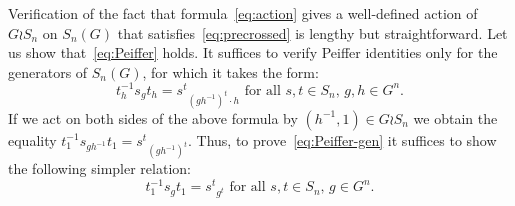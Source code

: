 \documentclass[oneside, 12pt]{amsart}
\theoremstyle{plain}
\numberwithin{equation}{section}
\numberwithin{lemma}{section}
\theoremstyle{remark}
\theoremstyle{definition}
\begin{document}

Verification of the fact that formula~\eqref{eq:action} gives a well-defined action of $G\wr S_n$ on $S_n(G)$ 
 that satisfies~\eqref{eq:precrossed} is lengthy but straightforward. Let us show that~\eqref{eq:Peiffer} holds. 
It suffices to verify Peiffer identities only for the generators of $S_n(G)$, for which it takes the form:
\begin{equation} \label{eq:Peiffer-gen} t^{-1}_h s_g t_h = {s^t}_{(gh^{-1})^t\cdot h} \text{ for all $s, t \in S_n$, $g, h\in G^n$.}\end{equation}
If we act on both sides of the above formula by $(h^{-1}, 1) \in G \wr S_n$ we obtain the equality
$t^{-1}_1 s_{gh^{-1}} t_1 = {s^t}_{(gh^{-1})^t}$.
Thus, to prove~\eqref{eq:Peiffer-gen} it suffices to show the following simpler relation:
\begin{equation} \label{eq:Peiffer-simple} t^{-1}_1 s_g t_1 = {s^t}_{g^t} \text{ for all $s, t \in S_n$, $g\in G^n$.}\end{equation}
\end{document}
